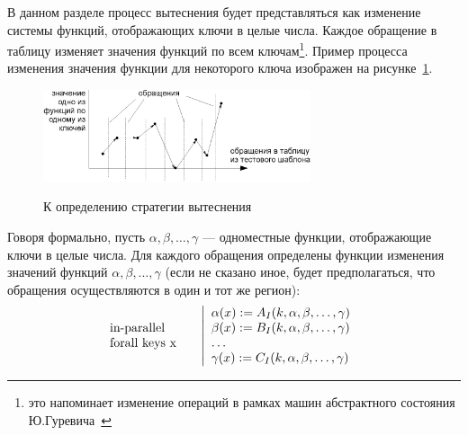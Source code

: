 
В данном разделе процесс вытеснения будет представляться как изменение  системы функций, отображающих ключи в целые числа. Каждое обращение в таблицу изменяет значения функций по всем ключам\footnote{это напоминает изменение операций в рамках машин абстрактного состояния Ю.Гуревича~\cite{ASM}}. Пример процесса изменения значения функции для некоторого ключа изображен на рисунке~\ref{fig:graphic}.

\begin{figure}[h] \center
  \includegraphics[width=0.7\textwidth]{2.theor/graphic}\\
  \caption{К определению стратегии вытеснения}\label{fig:graphic}
\end{figure}

Говоря формально, пусть $\alpha, \beta, \dots, \gamma$ --- одноместные функции,
отображающие ключи в целые числа. Для каждого обращения определены функции
изменения значений функций $\alpha, \beta, \dots, \gamma$ (если не сказано иное, будет предполагаться, что обращения осуществляются в один и тот же регион):
$$\parbox{2.5cm}{in-parallel\\forall keys x~}\left|\begin{array}{l}
\alpha(x) := A_I(k, \alpha, \beta, \dots, \gamma)\\
\beta(x) := B_I(k, \alpha, \beta, \dots, \gamma)\\
\dots\\
\gamma(x) := C_I(k, \alpha, \beta, \dots, \gamma)\\
\end{array}\right.
$$

